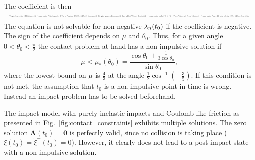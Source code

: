 \documentclass[global,twocolumn]{svjour}
\let\vec\bm
\newcommand{\vectoscalar}[1]{{\renewcommand{\vec}{}#1}}
\newcommand{\mat}[1]{{\bf #1}}
\newcommand{\tvect}[3]{\ensuremath{\begin{pmatrix}#1\\#2\\#3\end{pmatrix}}}
\newcommand{\transp}{{\mathrm{T}}}
\newcommand{\mass}   [1]{\ensuremath{m_{#1}}}
\newcommand{\cof}[1]{\ensuremath{\mu_{#1}}}
\newcommand{\contactforce}[1]{\ensuremath{\vec{\lambda}_{#1}}}
\newcommand{\contactforceCFn}[1]{\ensuremath{\vectoscalar{\contactforce{\ifstrequal{#1}{}{n}{#1,n}}}}}
\newcommand{\contactimpulse}[1]{\ensuremath{\vec{\Lambda}_{#1}}}
\renewcommand{\figref}[1]{Fig.~\ref{#1}}
\newcommand{\shrinkeqnnew}[2]{\resizebox{#1\linewidth}{!}{\begin{varwidth}[t]{2\linewidth}\ensuremath{\displaystyle{#2}}\end{varwidth}}}
\begin{document}
	The coefficient is then
	\begin{equation*}
		\shrinkeqnnew{1}{
		\vec n^\transp \mat{A}(t_0) \tvect{\cof{}}{1}{0} = \mass{a}^{-1} (1 + 3\cos \theta_0 (\cos \theta_0 - \cof{} \sin \theta_0)).
		}
	\end{equation*}
	The equation is not solvable for non-negative $\contactforceCFn{}(t_0)$ if
	the coefficient is negative. The sign of the coefficient depends on $\cof{}$
	and $\theta_0$. Thus, for a given angle $0 < \theta_0 < \frac{\pi}{2}$ the
	contact problem at hand has a non-impulsive solution if
	\begin{equation*}
		\cof{} < \cof{*}(\theta_0) = \frac{\cos \theta_0 + \frac{1}{3\cos \theta_0}}{\sin \theta_0},
	\end{equation*}
	where the lowest bound on $\cof{}$ is $\frac{4}{3}$ at the angle $\frac{1}{2} \cos^{-1} \left(-\frac{3}{5}\right)$.
	If this condition is not met, the assumption that $t_0$ is a non-impulsive point
	in time is wrong. Instead an impact problem has to be solved beforehand.

	The impact model with purely inelastic impacts and Coulomb-like friction as
	presented in \figref{fig:contact_constraints} exhibits multiple solutions.
	The zero solution $\contactimpulse{}(t_0) = \vec 0$ is perfectly valid,
	since no collision is taking place ($\xi(t_0) = \dot{\xi}^-(t_0) = 0$).
	However, it clearly does not lead to a post-impact state with a non-impulsive
	solution.
\end{document}
